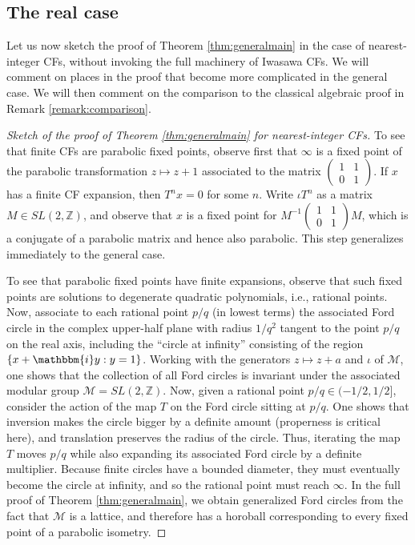 \documentclass[reqno,10pt]{amsart}
\newcommand{\ii}{\mathbbm{i}}
\newcommand{\Z}{\mathbb{Z}}
\numberwithin{thm}{section}
\theoremstyle{definition}
\theoremstyle{definition}
\numberwithin{equation}{section}
\newcommand{\Mod}{\mathcal M}
\begin{document}
\subsection{The real case}
Let us now sketch the proof of Theorem \ref{thm:generalmain} in the case of nearest-integer CFs, without invoking the full machinery of Iwasawa CFs. We will comment on places in the proof that become more complicated in the general case. We will then comment on the comparison to the classical algebraic proof in Remark \ref{remark:comparison}.

\begin{proof}[Sketch of the proof of Theorem \ref{thm:generalmain} for nearest-integer CFs]
\newcommand{\parabolicmatrix}{\begin{pmatrix}1&1\\0&1\end{pmatrix}}
To see that finite CFs are parabolic fixed points, observe first that $\infty$ is a fixed point of the parabolic transformation $z\mapsto z+1$ associated to the matrix $\parabolicmatrix$. If $x$ has a finite CF expansion, then $T^n x=0$ for some $n$. Write $\iota T^n$ as a matrix $M\in SL(2,\Z)$, and observe that $x$ is a fixed point for $M^{-1}\parabolicmatrix M$, which is a conjugate of a parabolic matrix and hence also parabolic. This step generalizes immediately to the general case.

To see that parabolic fixed points have finite expansions, observe that such fixed points are solutions to degenerate quadratic polynomials, i.e., rational points. Now, associate to each rational point $p/q$ (in lowest terms) the associated Ford circle in the complex upper-half plane with radius $1/q^2$ tangent to the point $p/q$ on the real axis, including the ``circle at infinity'' consisting of the region $\{x+\ii y: y=1\}$. Working with the generators $z\mapsto z+a$ and $\iota$ of $\Mod$, one shows that the collection of all Ford circles is invariant under the associated modular group $\Mod=SL(2,\Z)$. Now, given a rational point $p/q\in (-1/2,1/2]$, consider the action of the map $T$ on the Ford circle sitting at $p/q$. One shows that inversion makes the circle bigger by a definite amount (properness is critical here), and translation preserves the radius of the circle.  Thus, iterating the map $T$ moves $p/q$ while also expanding its associated Ford circle by a definite multiplier. Because finite circles have a bounded diameter, they must eventually become the circle at infinity, and so the rational point must reach $\infty$. In the full proof of Theorem \ref{thm:generalmain}, we obtain generalized Ford circles from the fact that $\Mod$ is a lattice, and therefore has a horoball corresponding to every fixed point of a parabolic isometry. 


\end{proof}
\end{document}
